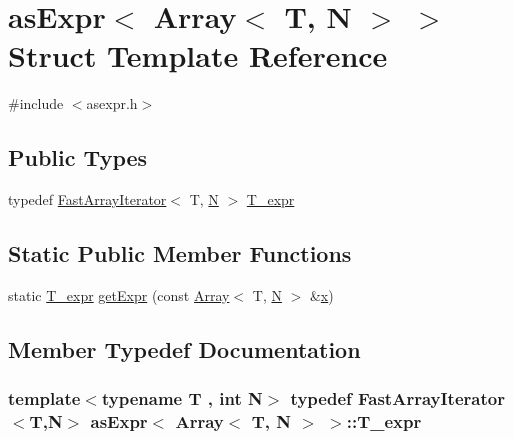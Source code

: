 \hypertarget{structasExpr_3_01Array_3_01T_00_01N_01_4_01_4}{}\section{as\+Expr$<$ Array$<$ T, N $>$ $>$ Struct Template Reference}
\label{structasExpr_3_01Array_3_01T_00_01N_01_4_01_4}


{\ttfamily \#include $<$asexpr.\+h$>$}

\subsection*{Public Types}
\begin{DoxyCompactItemize}
\item 
typedef \hyperlink{classFastArrayIterator}{Fast\+Array\+Iterator}$<$ T, \hyperlink{polmisc_8c_a0240ac851181b84ac374872dc5434ee4}{N} $>$ \hyperlink{structasExpr_3_01Array_3_01T_00_01N_01_4_01_4_ae7899defedaf6b9400341ccd022d8c7a}{T\+\_\+expr}
\end{DoxyCompactItemize}
\subsection*{Static Public Member Functions}
\begin{DoxyCompactItemize}
\item 
static \hyperlink{structasExpr_3_01Array_3_01T_00_01N_01_4_01_4_ae7899defedaf6b9400341ccd022d8c7a}{T\+\_\+expr} \hyperlink{structasExpr_3_01Array_3_01T_00_01N_01_4_01_4_a0e8c11c81bf12d3bed168cc9783da674}{get\+Expr} (const \hyperlink{classArray}{Array}$<$ T, \hyperlink{polmisc_8c_a0240ac851181b84ac374872dc5434ee4}{N} $>$ \&\hyperlink{vecnorm1_8cc_ac73eed9e41ec09d58f112f06c2d6cb63}{x})
\end{DoxyCompactItemize}


\subsection{Member Typedef Documentation}
\hypertarget{structasExpr_3_01Array_3_01T_00_01N_01_4_01_4_ae7899defedaf6b9400341ccd022d8c7a}{}
\subsubsection[{T\+\_\+expr}]{\setlength{\rightskip}{0pt plus 5cm}template$<$typename T , int N$>$ typedef {\bf Fast\+Array\+Iterator}$<$T,{\bf N}$>$ {\bf as\+Expr}$<$ {\bf Array}$<$ T, {\bf N} $>$ $>$\+::{\bf T\+\_\+expr}}\label{structasExpr_3_01Array_3_01T_00_01N_01_4_01_4_ae7899defedaf6b9400341ccd022d8c7a}


